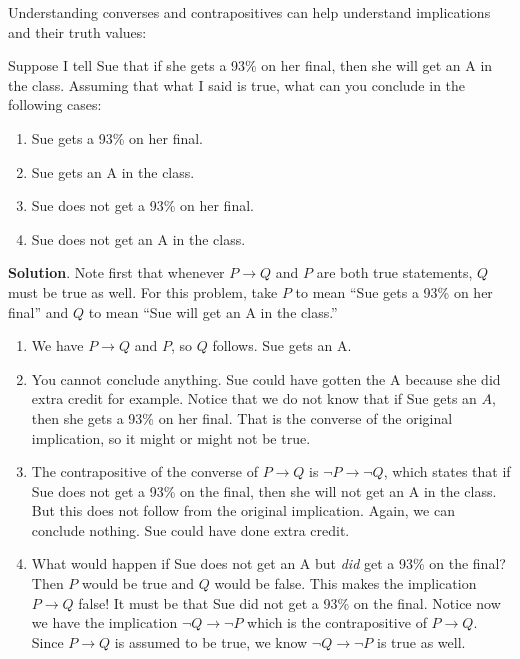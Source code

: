 \documentclass[11pt,]{book}
\theoremstyle{ptxplainnotitle}
\theoremstyle{ptxplaintitle}
\theoremstyle{ptxdefinitionnotitle}
\theoremstyle{ptxdefinitiontitle}
\theoremstyle{ptxdefinitionnotitle}
\theoremstyle{ptxdefinitiontitle}
\theoremstyle{ptxdefinitionnotitle}
\theoremstyle{ptxdefinitiontitle}
\theoremstyle{ptxdefinitiontitlenonumber}
\theoremstyle{ptxdefinitiontitlenonumber}
\numberwithin{equation}{chapter}
\newcommand{\imp}{\rightarrow}
\begin{document}
\hypertarget{p-1728}{}%
Understanding converses and contrapositives can help understand implications and their truth values:%
\begin{example}\label{example-52}
\hypertarget{p-1729}{}%
Suppose I tell Sue that if she gets a 93\% on her final, then she will get an A in the class. Assuming that what I said is true, what can you conclude in the following cases:%
\par
\hypertarget{p-1730}{}%
\leavevmode%
\begin{enumerate}
\item\hypertarget{li-730}{}\hypertarget{p-1731}{}%
Sue gets a 93\% on her final.%
\item\hypertarget{li-731}{}\hypertarget{p-1732}{}%
Sue gets an A in the class.%
\item\hypertarget{li-732}{}\hypertarget{p-1733}{}%
Sue does not get a 93\% on her final.%
\item\hypertarget{li-733}{}\hypertarget{p-1734}{}%
Sue does not get an A in the class.%
\end{enumerate}
%
\par\smallskip%
\noindent\textbf{Solution}.\hypertarget{solution-198}{}\quad%
\hypertarget{p-1735}{}%
Note first that whenever \(P \imp Q\) and \(P\) are both true statements, \(Q\) must be true as well. For this problem, take \(P\) to mean ``Sue gets a 93\% on her final'' and \(Q\) to mean ``Sue will get an A in the class.''%
\par
\hypertarget{p-1736}{}%
\leavevmode%
\begin{enumerate}
\item\hypertarget{li-734}{}\hypertarget{p-1737}{}%
We have \(P \imp Q\) and \(P\), so \(Q\) follows. Sue gets an A.%
\item\hypertarget{li-735}{}\hypertarget{p-1738}{}%
You cannot conclude anything. Sue could have gotten the A because she did extra credit for example. Notice that we do not know that if Sue gets an \(A\), then she gets a 93\% on her final. That is the converse of the original implication, so it might or might not be true.%
\item\hypertarget{li-736}{}\hypertarget{p-1739}{}%
The contrapositive of the converse of \(P \imp Q\) is \(\neg P \imp \neg Q\), which states that if Sue does not get a 93\% on the final, then she will not get an A in the class. But this does not follow from the original implication. Again, we can conclude nothing. Sue could have done extra credit.%
\item\hypertarget{li-737}{}\hypertarget{p-1740}{}%
What would happen if Sue does not get an A but \emph{did} get a 93\% on the final? Then \(P\) would be true and \(Q\) would be false. This makes the implication \(P \imp Q\) false! It must be that Sue did not get a 93\% on the final. Notice now we have the implication \(\neg Q \imp \neg P\) which is the contrapositive of \(P \imp Q\). Since \(P \imp Q\) is assumed to be true, we know \(\neg Q \imp \neg P\) is true as well.%
\end{enumerate}
%
\end{example}
\end{document}
